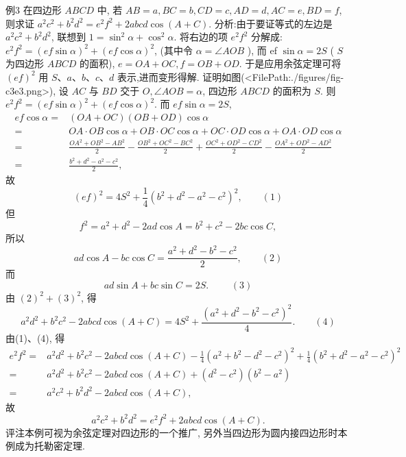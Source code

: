例3 在四边形 $A B C D$ 中, 若 $A B=a, B C=b, C D=c, A D=d, A C=e, B D=f$, 则求证 $a^2 c^2+b^2 d^2=e^2 f^2+2 a b c d \cos (A+C)$.
分析:由于要证等式的左边是 $a^2 c^2+b^2 d^2$, 联想到 $1=\sin ^2 \alpha+\cos ^2 \alpha$. 将右边的项 $e^2 f^2$ 分解成: $e^2 f^2=(e f \sin \alpha)^2+(e f \cos \alpha)^2$, (其中令 $\alpha=\angle A O B$ ), 而 ef $\sin \alpha=2 S$ ( $S$ 为四边形 $A B C D$ 的面积), $e=O A+O C, f=O B+O D$. 于是应用余弦定理可将 $(e f)^2$ 用 $S 、 a 、 b 、 c 、 d$ 表示,进而变形得解.
证明如图(<FilePath:./figures/fig-c3e3.png>), 设 $A C$ 与 $B D$ 交于 $O, \angle A O B= \alpha$, 四边形 $A B C D$ 的面积为 $S$. 则 $e^2 f^2=(e f \sin \alpha)^2+ (e f \cos \alpha)^2$.
而
$e f \sin \alpha=2 S$,
$$
\begin{aligned}
e f  \cos \alpha= & (O A+O C)(O B+O D) \cos \alpha \\
= & O A \cdot O B \cos \alpha+O B \cdot O C \cos \alpha+O C \cdot O D \cos \alpha  +O A \cdot O D \cos \alpha \\
= & \frac{O A^2+O B^2-A B^2}{2}-\frac{O B^2+O C^2-B C^2}{2}  +\frac{O C^2+O D^2-C D^2}{2}-\frac{O A^2+O D^2-A D^2}{2} \\
= & \frac{b^2+d^2-a^2-c^2}{2},
\end{aligned}
$$
故
$$
(e f)^2=4 S^2+\frac{1}{4}\left(b^2+d^2-a^2-c^2\right)^2, \quad\quad (1)
$$
但
$$
f^2=a^2+d^2-2 a d \cos A=b^2+c^2-2 b c \cos C,
$$
所以
$$
a d \cos A-b c \cos C=\frac{a^2+d^2-b^2-c^2}{2}, \quad\quad (2)
$$
而
$$
a d \sin A+b c \sin C=2 S \text {. }  \quad\quad (3)
$$
由 $(2)^2+(3)^2$, 得
$$
a^2 d^2+b^2 c^2-2 a b c d \cos (A+C)=4 S^2+\frac{\left(a^2+d^2-b^2-c^2\right)^2}{4} .  \quad\quad (4)
$$
由(1)、(4), 得 
$$
\begin{aligned}
e^2 f^2=& a^2 d^2+b^2 c^2-2 a b c d \cos (A+C)-\frac{1}{4}\left(a^2+b^2-d^2- c^2\right)^2+\frac{1}{4}\left(b^2+d^2-a^2-c^2\right)^2 \\
= & a^2 d^2+b^2 c^2-2 a b c d \cos (A+C)+\left(d^2-c^2\right)\left(b^2-a^2\right) \\
= & a^2 c^2+b^2 d^2-2 a b c d \cos (A+C),
\end{aligned}
$$
故
$$
a^2 c^2+b^2 d^2=e^2 f^2+2 a b c d \cos (A+C) .
$$
评注本例可视为余弦定理对四边形的一个推广, 另外当四边形为圆内接四边形时本例成为托勒密定理.



